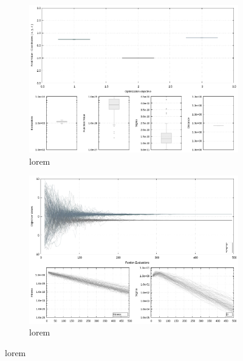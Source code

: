\begin{figure}[H]
         \centering
         \begin{subfigure}[h]{0.4\textwidth}
                 \centering
                 \includegraphics[width=\textwidth]{img/calibration/calibration_ant0-boxes.png}
                 \caption{lorem}
                 \label{fig:Final_Calibration_Ant0_ES-boxes}
         \end{subfigure}
%
\qquad         
%
         \begin{subfigure}[h]{0.4\textwidth}
                 \centering
                 \includegraphics[width=\textwidth]{img/calibration/calibration_ant0-lines.png}
                 \caption{lorem}
                 \label{fig:Final_Calibration_Ant0_ES-Lines}
         \end{subfigure}

\end{figure}
